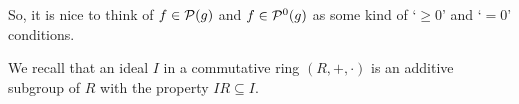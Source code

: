 So, it is nice to think of $f \in \mathcal{P}(g)$ and $f \in \mathcal{P}^0(g)$ as some kind of `$\ge 0$' and `$=0$' conditions. 




We recall that an ideal $I$ in a commutative ring $(R,+,\cdot)$ is an additive subgroup of $R$ with the property $I R \subseteq I$. 

